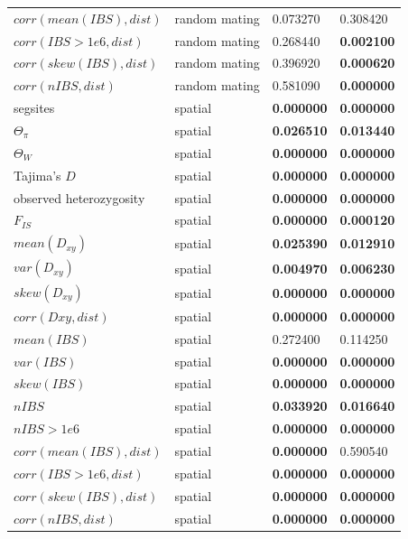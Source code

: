 \documentclass[10pt,twoside,lineno,hidelinks]{preprint}
\begin{document}
\begin{table}[htbp]
\begin{tableminipage}{\textwidth}
\begin{tabularx}{\textwidth}{XXXX}
$corr(mean(IBS),dist)$ & random mating & 0.073270 & 0.308420 \\ 
$corr(IBS>1e6,dist)$ & random mating & 0.268440 & \textbf{0.002100} \\ 
$corr(skew(IBS),dist)$ & random mating & 0.396920 & \textbf{0.000620} \\ 
$corr(nIBS,dist)$ & random mating & 0.581090 & \textbf{0.000000} \\ 
segsites & spatial & \textbf{0.000000} & \textbf{0.000000} \\ 
$\Theta_{\pi}$ & spatial & \textbf{0.026510} & \textbf{0.013440} \\ 
$\Theta_{W}$ & spatial & \textbf{0.000000} & \textbf{0.000000} \\ 
Tajima's $D$ & spatial & \textbf{0.000000} & \textbf{0.000000} \\ 
observed heterozygosity & spatial & \textbf{0.000000} & \textbf{0.000000} \\ 
$F_{IS}$ & spatial & \textbf{0.000000} & \textbf{0.000120} \\ 
$mean(D_{xy})$ & spatial & \textbf{0.025390} & \textbf{0.012910} \\ 
$var(D_{xy})$ & spatial & \textbf{0.004970} & \textbf{0.006230} \\ 
$skew(D_{xy})$ & spatial & \textbf{0.000000} & \textbf{0.000000} \\ 
$corr(Dxy,dist)$ & spatial & \textbf{0.000000} & \textbf{0.000000} \\ 
$mean(IBS)$ & spatial & 0.272400 & 0.114250 \\ 
$var(IBS)$ & spatial & \textbf{0.000000} & \textbf{0.000000} \\ 
$skew(IBS)$ & spatial & \textbf{0.000000} & \textbf{0.000000} \\ 
$nIBS$ & spatial & \textbf{0.033920} & \textbf{0.016640} \\ 
$nIBS>1e6$ & spatial & \textbf{0.000000} & \textbf{0.000000} \\ 
$corr(mean(IBS),dist)$ & spatial & \textbf{0.000000} & 0.590540 \\ 
$corr(IBS>1e6,dist)$ & spatial & \textbf{0.000000} & \textbf{0.000000} \\ 
$corr(skew(IBS),dist)$ & spatial & \textbf{0.000000} & \textbf{0.000000} \\ 
$corr(nIBS,dist)$ & spatial & \textbf{0.000000} & \textbf{0.000000} \\ 
\hline
\end{tabularx}
\end{tableminipage}
\label{table:sampling}
\end{table}
\end{document}

